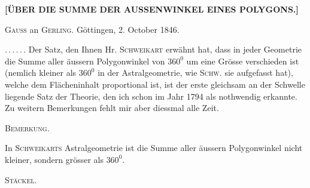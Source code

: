 \clearpage
{}%
\begin{center}
\textbf{[ÜBER DIE SUMME DER AUSSENWINKEL EINES POLYGONS.]}

\medskip
\textsc{Gauss} an \textsc{Gerling}. \quad Göttingen, 2. October 1846.
\end{center}

\mbox{.\,.\,.\,.\,.\,.} Der Satz, den Ihnen Hr. \textsc{Schweikart} erwähnt hat, dass in jeder Geometrie die Summe aller äussern Polygonwinkel von $360^0$ um eine Grösse verschieden ist (nemlich kleiner als $360^0$ in der Astralgeometrie, wie \textsc{Schw.} sie aufgefasst hat), welche dem Flächeninhalt proportional ist, ist der erste gleichsam an der Schwelle liegende Satz der Theorie, den ich schon im Jahr 1794 als nothwendig erkannte. Zu weitern Bemerkungen fehlt mir aber diessmal alle Zeit.

\begin{center}

\end{center}

\begin{center}\textsc{Bemerkung.}\end{center}

In \textsc{Schweikarts} Astralgeometrie ist die Summe aller äussern Polygonwinkel nicht kleiner, sondern grösser als $360^0$.

\hfill \textsc{Stäckel}.
